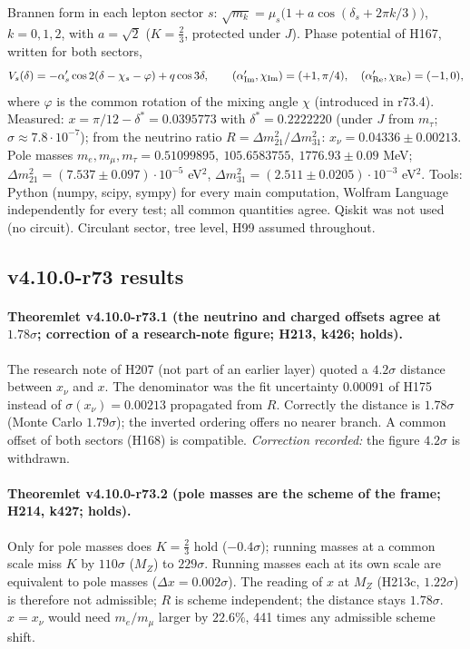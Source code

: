Brannen form in each lepton sector \(s\): \(\sqrt{m_k}=\mu_s\bigl(1+a\cos(\delta_s+2\pi k/3)\bigr)\), \(k=0,1,2\), with \(a=\sqrt2\) (\(K=\tfrac23\),
protected under \(J\)).  Phase potential of H167, written for both sectors,
\[
V_s(\delta)=-\alpha'_s\cos2(\delta-\chi_s-\varphi)+q\cos3\delta ,
\qquad
(\alpha'_{\rm Im},\chi_{\rm Im})=(+1,\pi/4),\quad (\alpha'_{\rm Re},\chi_{\rm Re})=(-1,0),
\]
where \(\varphi\) is the common rotation of the mixing angle \(\chi\) (introduced in r73.4).  Measured: \(x=\pi/12-\delta^*=0.0395773\) with
\(\delta^*=0.2222220\) (under \(J\) from \(m_\tau\); \(\sigma\approx7.8\cdot10^{-7}\)); from the neutrino ratio \(R=\Delta m^2_{21}/\Delta m^2_{31}\):
\(x_\nu=0.04336\pm0.00213\).  Pole masses \(m_e,m_\mu,m_\tau=0.51099895,\ 105.6583755,\ 1776.93\pm0.09\) MeV;
\(\Delta m^2_{21}=(7.537\pm0.097)\cdot10^{-5}\) eV\(^2\), \(\Delta m^2_{31}=(2.511\pm0.0205)\cdot10^{-3}\) eV\(^2\).  Tools: Python (numpy, scipy, sympy) for
every main computation, Wolfram Language independently for every test; all common quantities agree.  Qiskit was not used (no circuit).
Circulant sector, tree level, H99 assumed throughout.

\subsection*{v4.10.0-r73 results}
\label{subsec:v4100-r73-results}

\paragraph{Theoremlet v4.10.0-r73.1 (the neutrino and charged offsets agree at \(1.78\sigma\); correction of a research-note figure; H213, k426; holds).}
The research note of H207 (not part of an earlier layer) quoted a \(4.2\sigma\) distance between \(x_\nu\) and \(x\).  The denominator was the fit
uncertainty \(0.00091\) of H175 instead of \(\sigma(x_\nu)=0.00213\) propagated from \(R\).  Correctly the distance is \(1.78\sigma\) (Monte Carlo
\(1.79\sigma\)); the inverted ordering offers no nearer branch.  A common offset of both sectors (H168) is compatible.  \emph{Correction recorded:}
the figure \(4.2\sigma\) is withdrawn.

\paragraph{Theoremlet v4.10.0-r73.2 (pole masses are the scheme of the frame; H214, k427; holds).}
Only for pole masses does \(K=\tfrac23\) hold (\(-0.4\sigma\)); running masses at a common scale miss \(K\) by \(110\sigma\) (\(M_Z\)) to \(229\sigma\).
Running masses each at its own scale are equivalent to pole masses (\(\Delta x=0.002\sigma\)).  The reading of \(x\) at \(M_Z\) (H213c, \(1.22\sigma\))
is therefore not admissible; \(R\) is scheme independent; the distance stays \(1.78\sigma\).  \(x=x_\nu\) would need \(m_e/m_\mu\) larger by
\(22.6\%\), 441 times any admissible scheme shift.

